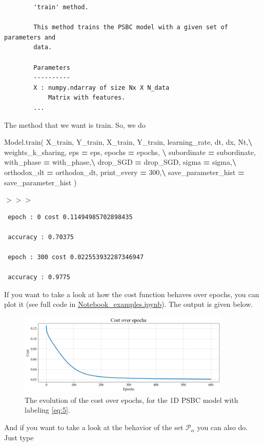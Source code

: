 \documentclass[openany,twoside]{book}
\newenvironment{Shaded}{\begin{snugshade}}{\end{snugshade}}
\newcommand{\DecValTok}[1]{\textcolor[rgb]{0.00,0.00,0.81}{#1}}
\newcommand{\NormalTok}[1]{#1}
\newcommand{\OperatorTok}[1]{\textcolor[rgb]{0.81,0.36,0.00}{\textbf{#1}}}
\begin{document}
\begin{verbatim}
        'train' method.

        This method trains the PSBC model with a given set of parameters and 
        data.
        
        Parameters
        ----------
        X : numpy.ndarray of size Nx X N_data
            Matrix with features. 
        ...    
\end{verbatim}

The method that we want is train. So, we do

\begin{Shaded}
\begin{Highlighting}[]
\NormalTok{Model.train(}
\NormalTok{    X_train, Y_train, X_train, Y_train, learning_rate, dt, dx, Nt,}\OperatorTok{\textbackslash{}}
\NormalTok{        weights_k_sharing, eps }\OperatorTok{=}\NormalTok{ eps, epochs }\OperatorTok{=}\NormalTok{ epochs, }\OperatorTok{\textbackslash{}}
\NormalTok{        subordinate }\OperatorTok{=}\NormalTok{ subordinate, with_phase }\OperatorTok{=}\NormalTok{ with_phase,}\OperatorTok{\textbackslash{}}
\NormalTok{        drop_SGD }\OperatorTok{=}\NormalTok{ drop_SGD, sigma }\OperatorTok{=}\NormalTok{ sigma,}\OperatorTok{\textbackslash{}}
\NormalTok{        orthodox_dt }\OperatorTok{=}\NormalTok{ orthodox_dt, print_every }\OperatorTok{=} \DecValTok{300}\NormalTok{,}\OperatorTok{\textbackslash{}}
\NormalTok{            save_parameter_hist }\OperatorTok{=}\NormalTok{ save_parameter_hist}
\NormalTok{)}
\end{Highlighting}
\end{Shaded}

\(>>>\)

\begin{verbatim}
 epoch : 0 cost 0.11494985702898435

 accuracy : 0.70375

 epoch : 300 cost 0.022553932287346947

 accuracy : 0.9775
\end{verbatim}

If you want to take a look at how the cost function behaves over epochs, you can plot it (see full code in \href{https://github.com/rafael-a-monteiro-math/Binary_classification_phase_separation/blob/master/Notebook_PSBC_examples.ipynb}{Notebook\_examples.ipynb}). The output is given below.

\begin{figure}[htbp]
\centering
\includegraphics[width=0.9\textwidth,height=\textheight]{figures/output_37_0.png}
\caption{The evolution of the cost over epochs, for the 1D PSBC model with labeling \ref{eq:5}.}
\end{figure}
And if you want to take a look at the behavior of the set \(\mathscr{P}_{\alpha}\) you can also do. Just type
\end{document}

